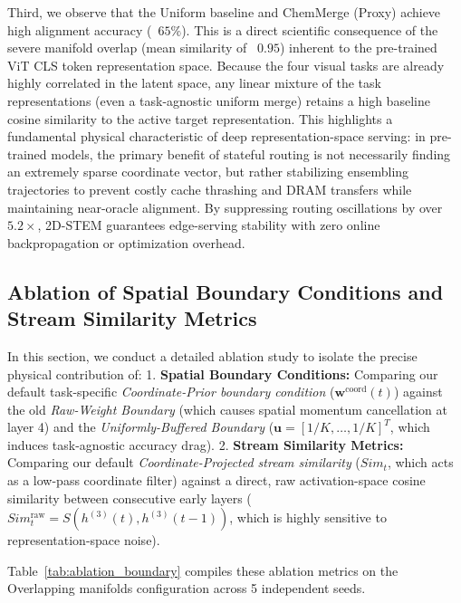 Third, we observe that the Uniform baseline and ChemMerge (Proxy) achieve high alignment accuracy (~$65\%$). This is a direct scientific consequence of the severe manifold overlap (mean similarity of ~$0.95$) inherent to the pre-trained ViT CLS token representation space. Because the four visual tasks are already highly correlated in the latent space, any linear mixture of the task representations (even a task-agnostic uniform merge) retains a high baseline cosine similarity to the active target representation. This highlights a fundamental physical characteristic of deep representation-space serving: in pre-trained models, the primary benefit of stateful routing is not necessarily finding an extremely sparse coordinate vector, but rather stabilizing ensembling trajectories to prevent costly cache thrashing and DRAM transfers while maintaining near-oracle alignment. By suppressing routing oscillations by over $5.2\times$, 2D-STEM guarantees edge-serving stability with zero online backpropagation or optimization overhead.

\subsection{Ablation of Spatial Boundary Conditions and Stream Similarity Metrics}
In this section, we conduct a detailed ablation study to isolate the precise physical contribution of:
1. \textbf{Spatial Boundary Conditions:} Comparing our default task-specific \emph{Coordinate-Prior boundary condition} ($\mathbf{w}^{\text{coord}}(t)$) against the old \emph{Raw-Weight Boundary} (which causes spatial momentum cancellation at layer 4) and the \emph{Uniformly-Buffered Boundary} ($\mathbf{u} = [1/K, \dots, 1/K]^T$, which induces task-agnostic accuracy drag).
2. \textbf{Stream Similarity Metrics:} Comparing our default \emph{Coordinate-Projected stream similarity} ($Sim_t$, which acts as a low-pass coordinate filter) against a direct, raw activation-space cosine similarity between consecutive early layers ($Sim_t^{\text{raw}} = S(h^{(3)}(t), h^{(3)}(t-1))$, which is highly sensitive to representation-space noise).

Table~\ref{tab:ablation_boundary} compiles these ablation metrics on the Overlapping manifolds configuration across 5 independent seeds.

